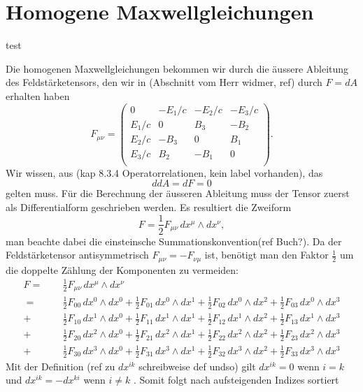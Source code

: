 \section{Homogene Maxwellgleichungen}
test

Die homogenen Maxwellgleichungen bekommen wir durch die äussere Ableitung des Feldstärketensors, den wir in (Abschnitt vom Herr widmer, ref) durch $F = dA$ erhalten haben
\[
F_{\mu\nu}
= 
\begin{pmatrix}
	0 & -E_1/c & -E_2/c & -E_3/c \\
	E_1/c &  0 &  B_3 & -B_2 \\
	E_2/c & -B_3 &  0 &  B_1 \\
	E_3/c &  B_2 & -B_1 &  0 \\
\end{pmatrix}.
\]
Wir wissen, aus (kap 8.3.4 Operatorrelationen, kein label vorhanden), das
\[
ddA = dF = 0
\]
gelten muss.
Für die Berechnung der äusseren Ableitung muss der Tensor zuerst als Differentialform geschrieben werden.
Es resultiert die Zweiform
\[
F
= \frac{1}{2} F_{\mu\nu} \, dx^\mu \wedge dx^\nu,
\]
man beachte dabei die einsteinsche Summationskonvention(ref Buch?).
Da der Feldstärketensor antisymmetrisch $F_{\mu\nu} = -F_{\nu\mu}$ ist, benötigt man den Faktor $\frac{1}{2}$ um die doppelte Zählung der Komponenten zu vermeiden:
\begin{align*}
	F
	= 
	\phantom{+} &\frac{1}{2} F_{\mu\nu} \, dx^\mu \wedge dx^\nu
	\\
	=
	\phantom{+} &\frac{1}{2} F_{00} \, dx^0 \wedge dx^0 + \frac{1}{2} F_{01} \, dx^0 \wedge dx^1 + \frac{1}{2} F_{02} \, dx^0 \wedge dx^2 + \frac{1}{2} F_{03} \, dx^0 \wedge dx^3
	\\
	+ &\frac{1}{2} F_{10} \, dx^1 \wedge dx^0 + \frac{1}{2} F_{11} \, dx^1 \wedge dx^1 + \frac{1}{2} F_{12} \, dx^1 \wedge dx^2 + \frac{1}{2} F_{13} \, dx^1 \wedge dx^3
	\\
	+ &\frac{1}{2} F_{20} \, dx^2 \wedge dx^0 + \frac{1}{2} F_{21} \, dx^2 \wedge dx^1 + \frac{1}{2} F_{22} \, dx^2 \wedge dx^2 + \frac{1}{2} F_{23} \, dx^2 \wedge dx^3
	\\
	+ &\frac{1}{2} F_{30} \, dx^3 \wedge dx^0 + \frac{1}{2} F_{31} \, dx^3 \wedge dx^1 + \frac{1}{2} F_{32} \, dx^3 \wedge dx^2 + \frac{1}{2} F_{33} \, dx^3 \wedge dx^3
\end{align*} 
Mit der Definition (ref zu $dx^{ik}$ schreibweise def undso) gilt $dx^{ik} = 0$ wenn $i=k$ und $dx^{ik} = -dx^{ki}$ wenn $i \neq k $ . Somit folgt nach aufsteigenden Indizes sortiert

